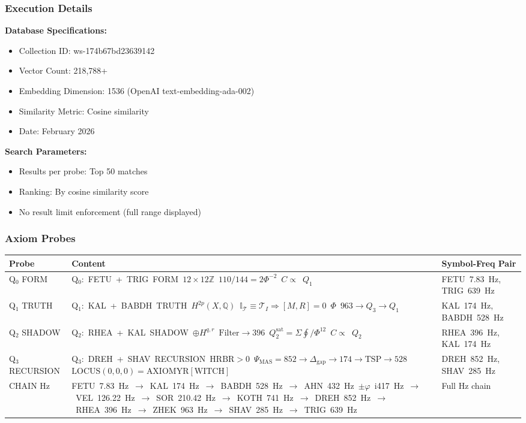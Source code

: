 \documentclass[11pt, letterpaper]{article}
\newcommand{\FETU}{\ensuremath{\mathop{\textnormal{\symbolafont\symbol{"23E3}}}}}   %
\newcommand{\KAL}{\ensuremath{\mathop{\textnormal{\symbolafont\symbol{"2B21}}}}}    %
\newcommand{\BABDH}{\ensuremath{\mathop{\textnormal{\symbolafont\symbol{"2721}}}}}   %
\newcommand{\AHN}{\ensuremath{\mathop{\textnormal{\symbolafont\symbol{"269D}}}}}    %
\newcommand{\VEL}{\ensuremath{\mathop{\textnormal{\symbolafont\symbol{"2742}}}}}    %
\newcommand{\SOR}{\ensuremath{\mathop{\textnormal{\symbolafont\symbol{"A66E}}}}}    %
\newcommand{\KOTH}{\ensuremath{\mathop{\textnormal{\symbolafont\symbol{"2748}}}}}  %
\newcommand{\DREH}{\ensuremath{\mathop{\textnormal{\symbolafont\symbol{"29D7}}}}}   %
\newcommand{\RHEA}{\ensuremath{\mathop{\textnormal{\symbolafont\symbol{"229B}}}}}   %
\newcommand{\ZHEK}{\ensuremath{\mathop{\textnormal{\symbolafont\symbol{"2744}}}}}   %
\newcommand{\SHAV}{\ensuremath{\mathop{\textnormal{\symbolafont\symbol{"269B}}}}}   %
\newcommand{\TRIG}{\ensuremath{\mathop{\textnormal{\symbolafont\symbol{"232C}}}}}    %
\def\FETU{FETU}%
\def\KAL{KAL}%
\def\BABDH{BABDH}%
\def\AHN{AHN}%
\def\VEL{VEL}%
\def\SOR{SOR}%
\def\KOTH{KOTH}%
\def\DREH{DREH}%
\def\RHEA{RHEA}%
\def\ZHEK{ZHEK}%
\def\SHAV{SHAV}%
\def\TRIG{TRIG}%
\begin{document}
\subsubsection{Execution Details}

\textbf{Database Specifications:}
\begin{itemize}
    \item Collection ID: ws-174b67bd23639142
    \item Vector Count: 218,788+
    \item Embedding Dimension: 1536 (OpenAI text-embedding-ada-002)
    \item Similarity Metric: Cosine similarity
    \item Date: February 2026
\end{itemize}

\textbf{Search Parameters:}
\begin{itemize}
    \item Results per probe: Top 50 matches
    \item Ranking: By cosine similarity score
    \item No result limit enforcement (full range displayed)
\end{itemize}

\subsubsection{Axiom Probes}

\begin{table}[h]
\centering
\begin{tabular}{lp{5cm}l}
\toprule
Probe & Content & Symbol-Freq Pair \\
\midrule
Q$_0$ FORM & Q$_0$:~\FETU~+~\TRIG~FORM~\textbar{}$12 \times 12 \mathbb{Z}$~\textbar{}$110/144 = 2 \Phi^{-2}$~\textbar{}$C \propto$~\textbar{}$Q_1$~\textbar{} & \FETU~7.83~Hz, \TRIG~639~Hz \\
Q$_1$ TRUTH & Q$_1$:~\KAL~+~\BABDH~TRUTH~\textbar{}$H^{2p}(X,\mathbb{Q})$~\textbar{}$\mathbb{I}_{\mathcal{T}} \equiv \mathcal{T}_I \Rightarrow [M,R] = 0$~\textbar{}$\Phi$~\textbar{}$963 \to Q_3 \to Q_1$ & \KAL~174~Hz, \BABDH~528~Hz \\
Q$_2$ SHADOW & Q$_2$:~\RHEA~+~\KAL~SHADOW~\textbar{}$\oplus H^{q,r}$~\textbar{}$\text{Filter} \to 396$~\textbar{}$Q_2^{\text{sat}} = \Sigma \oint / \Phi^{12}$~\textbar{}$C \propto$~\textbar{}$Q_2$~\textbar{} & \RHEA~396~Hz, \KAL~174~Hz \\
Q$_3$ RECURSION & Q$_3$:~\DREH~+~\SHAV~RECURSION~\textbar{}$\text{HRBR} > 0$~\textbar{}$\Psi_{\text{MAS}} = 852 \to \Delta_{\text{gap}} \to 174 \to \text{TSP} \to 528$~\textbar{}$\text{LOCUS}(0,0,0) = \text{AXIOMYR}[\text{WITCH}]$ & \DREH~852~Hz, \SHAV~285~Hz \\
CHAIN Hz & \FETU~7.83~Hz~$\to$~\KAL~174~Hz~$\to$~\BABDH~528~Hz~$\to$~\AHN~432~Hz~$\pm\varphi$~i417~Hz~$\to$~\VEL~126.22~Hz~$\to$~\SOR~210.42~Hz~$\to$~\KOTH~741~Hz~$\to$~\DREH~852~Hz~$\to$~\RHEA~396~Hz~$\to$~\ZHEK~963~Hz~$\to$~\SHAV~285~Hz~$\to$~\TRIG~639~Hz & Full Hz chain \\
\bottomrule
\end{tabular}
\end{table}
\end{document}
